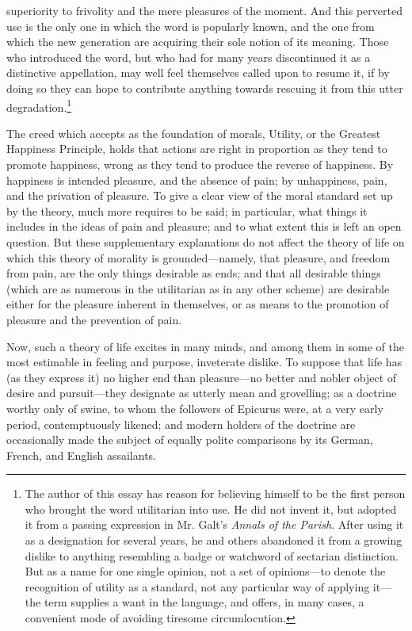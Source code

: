 superiority to frivolity and the mere pleasures of the moment. And
this perverted use is the only one in which the word is popularly
known, and the one from which the new generation are acquiring their
sole notion of its meaning. Those who introduced the word, but who had
for many years discontinued it as a distinctive appellation, may well
feel themselves called upon to resume it, if by doing so they can hope
to contribute anything towards rescuing it from this utter
degradation.\footnote{The author of this essay has reason for
believing himself to be the first person who brought the word
utilitarian into use. He did not invent it, but adopted it from a
passing expression in Mr. Galt's \textit{Annals of the Parish}. After
using it as a designation for several years, he and others abandoned
it from a growing dislike to anything resembling a badge or watchword
of sectarian distinction. But as a name for one single opinion, not a
set of o\-pin\-ions---to denote the recognition of utility as a
standard, not any particular way of applying it---the term supplies a
want in the language, and offers, in many cases, a convenient mode of
avoiding tiresome circumlocution.}

The creed which accepts as the foundation of morals, Utility, or the
Greatest Happiness Principle, holds that actions are right in
proportion as they tend to promote happiness, wrong as they tend to
produce the  reverse of happiness. By happiness is intended
pleasure, and the absence of pain; by unhappiness, pain, and the
privation of pleasure. To give a clear view of the moral standard set
up by the theory, much more requires to be said; in particular, what
things it includes in the ideas of pain and pleasure; and to what
extent this is left an open question. But these supplementary
explanations do not affect the theory of life on which this theory of
morality is ground\-ed---name\-ly, that pleasure, and freedom from
pain, are the only things desirable as ends; and that all desirable
things (which are as numerous in the utilitarian as in any other
scheme) are desirable either for the pleasure inherent in themselves,
or as means to the promotion of pleasure and the prevention of pain.

Now, such a theory of life excites in many minds, and among them in
some of the most estimable in feeling and purpose, inveterate dislike.
To suppose that life has (as they express it) no higher end than
pleas\-ure---no better and nobler object of desire and
pur\-suit---they designate as utterly mean and grovelling; as a
doctrine worthy only of swine, to whom the followers of Epicurus were,
at a very early period, contemptuously likened; and modern holders of
the doctrine are occasionally made the subject of equally polite
comparisons by its German, French, and English assailants.

